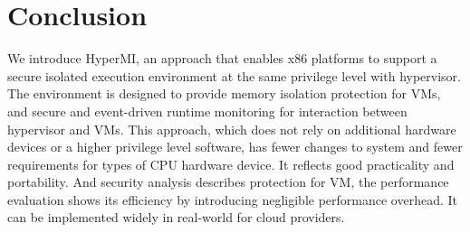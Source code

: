 \documentclass[conference]{IEEEtran}
\begin{document}
\section{Conclusion}\label{sec:conclusion}
We introduce HyperMI, an approach that enables x86 platforms to support a secure isolated execution environment at the same privilege level with hypervisor. The environment is designed to provide memory isolation protection for VMs, and secure and event-driven runtime monitoring for interaction between hypervisor and VMs. This approach, which does not rely on additional hardware devices or a higher privilege level software, has fewer changes to system and fewer requirements for types of CPU hardware device. It reflects good practicality and portability. And security analysis describes protection for VM, the performance evaluation shows its efficiency by introducing negligible performance overhead. It can be implemented widely in real-world for cloud providers.


 

\end{document}
